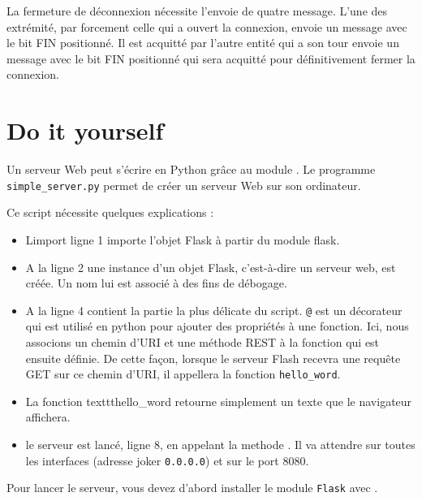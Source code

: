 {La fermeture de déconnexion nécessite l'envoie de quatre message. L'une des extrémité, par forcement celle qui a ouvert la connexion, envoie un message avec le bit FIN positionné. Il est acquitté par l'autre entité qui a son tour envoie un message avec le bit FIN positionné qui sera acquitté pour définitivement fermer la connexion.
}   

\section{Do it yourself}\label{chap-flask}

Un serveur Web peut s'écrire en Python grâce au module . Le programme \texttt{simple\_server.py} permet de créer un serveur Web sur son ordinateur.

 
 Ce script nécessite quelques explications :

\begin{itemize}
    \item Limport ligne 1 importe l'objet Flask à partir du module flask.
    \item A la ligne 2 une instance d'un objet Flask, c'est-à-dire un serveur web, est créée. Un nom lui est associé à des fins de débogage.
    \item A la ligne 4 contient la partie la plus délicate du script. \texttt{@} est un décorateur qui est utilisé en python pour ajouter des propriétés à une fonction. Ici, nous associons un chemin d'URI et une méthode REST à la fonction qui est ensuite définie. De cette façon, lorsque le serveur Flash recevra une requête GET sur ce chemin d'URI, il appellera la fonction \texttt{hello\_word}.
    \item La fonction texttt{hello\_word} retourne simplement un texte que le navigateur affichera.
    \item le serveur est lancé, ligne 8, en appelant la methode . Il va attendre sur toutes les interfaces (adresse joker \texttt{0.0.0.0}) et sur le port 8080. 
\end{itemize}

  \vspace{1em}

Pour lancer le serveur, vous devez d'abord installer le module \texttt{Flask} avec \texttt{}.

